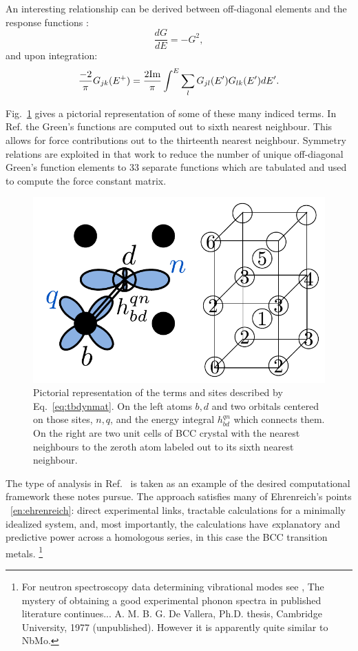 An interesting relationship can be derived between off-diagonal elements
and the response functions \cite{terakura82, sutton88}:
%
\begin{equation}
\frac{dG}{dE}=-G^{2},
\end{equation}
%
and upon integration:
%
\begin{equation}
\frac{-2}{\pi}G_{jk}(E^{+}) = \frac{2{\rm Im}}{\pi}\int^{E}\sum_{l}G_{jl}(E')G_{lk}(E')dE'.
\end{equation}
%

Fig.~\ref{fig:tbresponse} gives a pictorial representation of some of these many indiced terms. In 
Ref.\cite{finnis84} the Green's functions are computed out to sixth nearest neighbour. This allows
for force contributions out to the thirteenth nearest neighbour. Symmetry relations are exploited 
in that work to reduce the number of unique off-diagonal Green's function elements to 
33 separate functions which are tabulated and used to compute the force constant matrix. 
%
\begin{figure}
\begin{center}
\includegraphics[scale=0.8]{./invariance/tbresponse.pdf}
\caption{Pictorial representation of the terms and sites 
described by Eq.~\ref{eq:tbdynmat}. On the left atoms $b,d$ 
and two orbitals centered on those sites, $n, q$, and the energy
integral $h_{bd}^{qn}$ which connects them. On the right are two unit cells
of BCC crystal with the nearest neighbours to the zeroth atom 
labeled out to its sixth nearest neighbour.\label{fig:tbresponse}}
\end{center}
\end{figure}

The type of analysis in Ref.~\cite{finnis84} is taken as an example
of the desired computational framework these notes pursue. 
The approach satisfies many of Ehrenreich's points ~\ref{en:ehrenreich}: 
direct experimental links, tractable calculations 
for a minimally idealized system, and, most importantly, 
the calculations have {\emph explanatory and predictive power 
across a homologous series}, in this case the BCC transition metals.
\footnote{For neutron spectroscopy data determining vibrational modes 
see \cite{powell68, colella70, shaw71}, The mystery of obtaining a 
good experimental phonon spectra in published literature continues... 
A. M. B. G. De Vallera, Ph.D. thesis, Cambridge University, 1977 (unpublished).
However it is apparently quite similar to NbMo\cite{powerll68}.}

